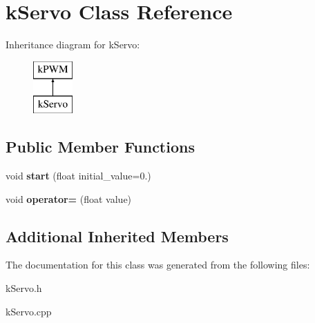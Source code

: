 \hypertarget{classkServo}{}\section{k\+Servo Class Reference}
\label{classkServo}
Inheritance diagram for k\+Servo\+:\begin{figure}[H]
\begin{center}
\leavevmode
\includegraphics[height=2.000000cm]{classkServo}
\end{center}
\end{figure}
\subsection*{Public Member Functions}
\begin{DoxyCompactItemize}
\item 
void {\bfseries start} (float initial\+\_\+value=0.)\hypertarget{classkServo_a57401b58c34287b31db5ed30889e9f47}{}\label{classkServo_a57401b58c34287b31db5ed30889e9f47}

\item 
void {\bfseries operator=} (float value)\hypertarget{classkServo_a9aa52b5e04059063f696618c53233676}{}\label{classkServo_a9aa52b5e04059063f696618c53233676}

\end{DoxyCompactItemize}
\subsection*{Additional Inherited Members}


The documentation for this class was generated from the following files\+:\begin{DoxyCompactItemize}
\item 
k\+Servo.\+h\item 
k\+Servo.\+cpp\end{DoxyCompactItemize}

